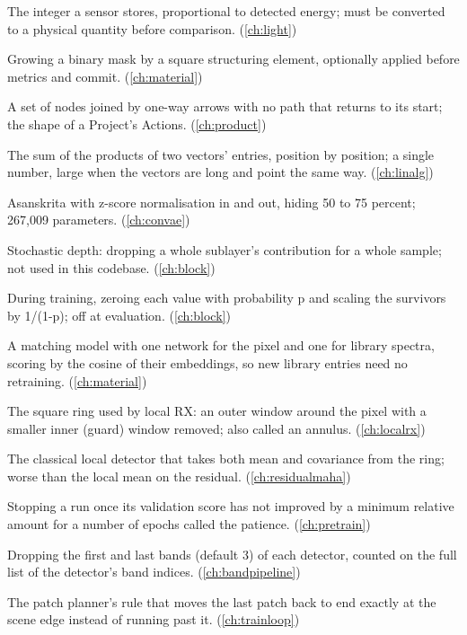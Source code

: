 \begin{description}[style=nextline,leftmargin=1.2em,font=\normalfont\bfseries]
\item[Digital number (DN)] The integer a sensor stores, proportional to detected energy; must be converted to a physical quantity before comparison. (\cref{ch:light})
\item[Dilation] Growing a binary mask by a square structuring element, optionally applied before metrics and commit. (\cref{ch:material})
\item[Directed acyclic graph (DAG)] A set of nodes joined by one-way arrows with no path that returns to its start; the shape of a Project's Actions. (\cref{ch:product})
\item[Dot product] The sum of the products of two vectors' entries, position by position; a single number, large when the vectors are long and point the same way. (\cref{ch:linalg})
\item[Drashta] Asanskrita with z-score normalisation in and out, hiding 50 to 75 percent; 267,009 parameters. (\cref{ch:convae})
\item[Drop path] Stochastic depth: dropping a whole sublayer's contribution for a whole sample; not used in this codebase. (\cref{ch:block})
\item[Dropout] During training, zeroing each value with probability p and scaling the survivors by 1/(1-p); off at evaluation. (\cref{ch:block})
\item[Dual encoder] A matching model with one network for the pixel and one for library spectra, scoring by the cosine of their embeddings, so new library entries need no retraining. (\cref{ch:material})
\item[Dual window] The square ring used by local RX: an outer window around the pixel with a smaller inner (guard) window removed; also called an annulus. (\cref{ch:localrx})
\item[Dual-window RX] The classical local detector that takes both mean and covariance from the ring; worse than the local mean on the residual. (\cref{ch:residualmaha})
\item[Early stopping] Stopping a run once its validation score has not improved by a minimum relative amount for a number of epochs called the patience. (\cref{ch:pretrain})
\item[Edge band trimming] Dropping the first and last bands (default 3) of each detector, counted on the full list of the detector's band indices. (\cref{ch:bandpipeline})
\item[Edge snapping] The patch planner's rule that moves the last patch back to end exactly at the scene edge instead of running past it. (\cref{ch:trainloop})

\end{description}
